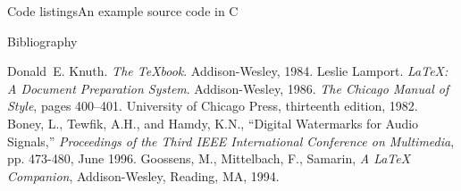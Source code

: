 \documentclass{beamer}
\begin{document}
  \begin{frame}{Code listings}{An example source code in C}
    \sleepSort
  \end{frame}

  \begin{frame}[label=bib]{Bibliography}
    \begin{thebibliography}{9}
          Donald~E. Knuth.
          \textit{The \TeX book}.
          Addison-Wesley, 1984.
          Leslie Lamport.
          \textit{\LaTeX : A Document Preparation System}.
          Addison-Wesley, 1986.
          \textit{The Chicago Manual of Style},
          pages 400--401.
          University of Chicago Press, thirteenth edition, 1982.
       Boney, L., Tewfik, A.H., and Hamdy, K.N., “Digital
          Watermarks for Audio Signals,” \textit{Proceedings of the Third IEEE
          International Conference on Multimedia}, pp. 473-480, June 1996.
       Goossens, M., Mittelbach, F., Samarin, \textit{A LaTeX
          Companion}, Addison-Wesley, Reading, MA, 1994.
      \end{thebibliography}
  \end{frame}
\end{document}
